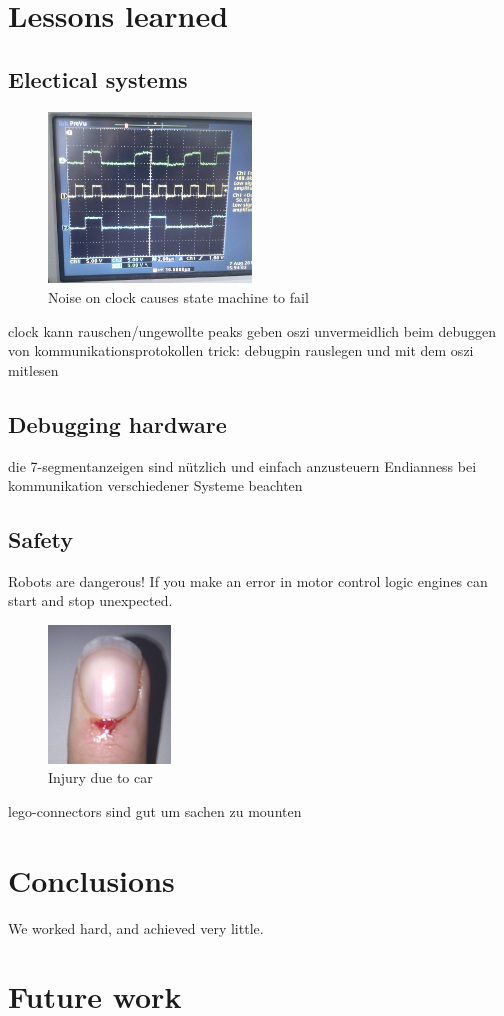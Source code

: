 \documentclass[a4paper
               ,10pt
               ,DIV=10 %
               ,BCOR=0.3cm
               ,pagesize %
               ,headings=small
               ,bibtotoc
               ]
               {scrartcl}
\begin{document}
\section{Lessons learned}
\subsection{Electical systems}
\begin{figure}
\includegraphics[width=0.48\textwidth]{pic/spi.png}
\caption{Noise on clock causes state machine to fail}
\label{figsim}
\end{figure}
clock kann rauschen/ungewollte peaks geben
oszi unvermeidlich beim debuggen von kommunikationsprotokollen
trick: debugpin rauslegen und mit dem oszi mitlesen
\subsection{Debugging hardware}
die 7-segmentanzeigen sind nützlich und einfach anzusteuern
Endianness bei kommunikation verschiedener Systeme beachten
\subsection{Safety}
Robots are dangerous! If you make an error in motor control logic engines can start and stop unexpected. 
\begin{figure}
\includegraphics[width=0.29\textwidth]{pic/finger.png}
\caption{Injury due to car}
\label{figsim}
\end{figure}




lego-connectors sind gut um sachen zu mounten




\section{Conclusions}\label{conclusions}
We worked hard, and achieved very little.

\section{Future work}
\end{document}
